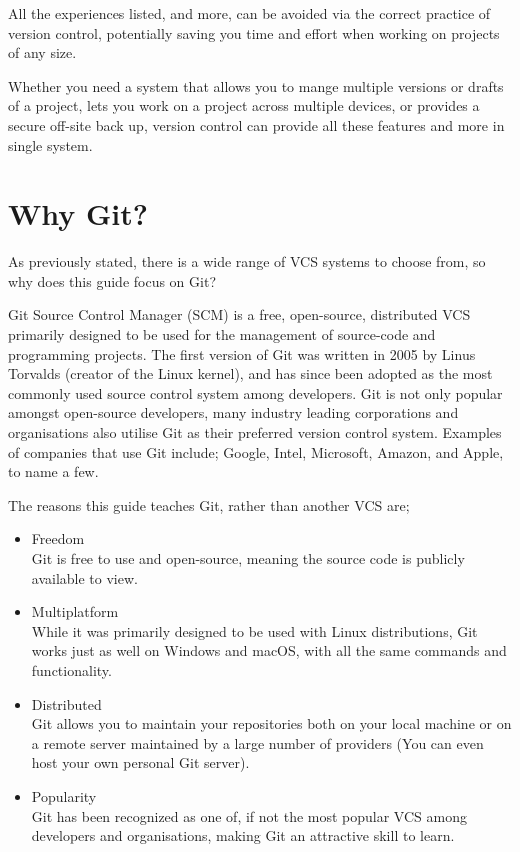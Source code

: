 \documentclass[11pt, a4paper, draft, titlepage]{article}
\begin{document}
All the experiences listed, and more, can be avoided via the correct practice
of version control, potentially saving you time and effort when working on
projects of any size.

Whether you need a system that allows you to mange multiple versions or drafts
of a project, lets you work on a project across multiple devices, or provides a
secure off-site back up, version control can provide all these features and more
in single system.


\section{Why Git?} As previously stated, there is a wide range of VCS systems
to choose from, so why does this guide focus on Git?

Git Source Control Manager (SCM) is a free, open-source, distributed VCS
primarily designed to be used for the management of source-code and
programming projects.  The first version of Git was written in 2005 by Linus
Torvalds (creator of the Linux kernel), and has since been adopted as the most
commonly used source control system among developers.  Git is not only popular
amongst open-source developers, many industry leading corporations and
organisations also utilise Git as their preferred version control system.
Examples of companies that use Git include; Google, Intel, Microsoft, Amazon,
and Apple, to name a few.


The reasons this guide teaches Git, rather than another VCS are;
\begin{itemize} 
\item Freedom \\ Git is free to use and open-source, meaning
the source code is publicly available to view.  
\item Multiplatform \\ While
it was primarily designed to be used with Linux distributions, Git works just
as well on Windows and macOS, with all the same commands and functionality.
\item Distributed \\ Git allows you to maintain your repositories both on your
local machine or on a remote server maintained by a large number of providers
(You can even host your own personal Git server).  
\item Popularity \\ Git has
been recognized as one of, if not the most popular VCS among developers and
organisations, making Git an attractive skill to learn.  
\end{itemize}
\end{document}
